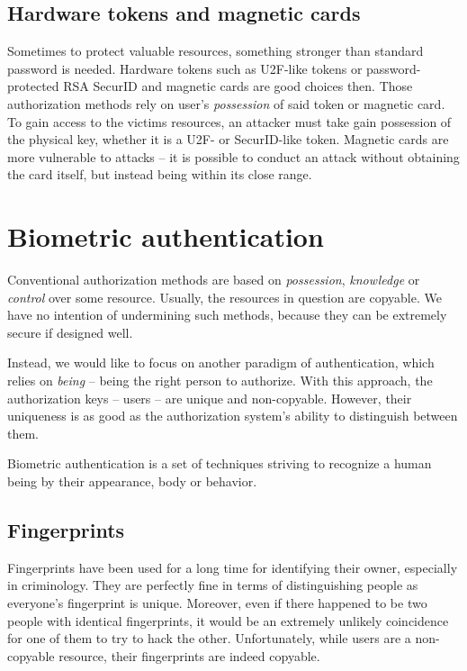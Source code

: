         \subsection*{Hardware tokens and magnetic cards}
            Sometimes to protect valuable resources,
            something stronger than standard password is needed.
            Hardware tokens such as U2F-like tokens or password-protected RSA SecurID
            and magnetic cards are good choices then.
            Those authorization methods rely on user's
            \textit{possession} of said token or magnetic card. To
            gain access to the victims resources, an attacker must take gain
            possession of the physical key, whether it is a U2F- or SecurID-like token.
            Magnetic cards are more vulnerable to attacks -- it is possible to
            conduct an attack without obtaining the card itself, but instead
            being within its close range.

    \section{Biometric authentication}
        Conventional authorization methods are based on \textit{possession},
        \textit{knowledge} or \textit{control} over some resource. Usually, the
        resources in question are copyable.
        We have no intention of undermining such methods, because they can be
        extremely secure if designed well.

        Instead, we would like to focus on another paradigm of authentication,
        which relies on \textit{being} -- being the right person to authorize.
        With this approach, the authorization keys -- users -- are unique and non-copyable. However,
        their uniqueness is as good as the authorization system's ability to
        distinguish between them.

        Biometric authentication is a set of techniques striving to recognize a
        human being by their appearance, body or behavior.

        \subsection*{Fingerprints}
            Fingerprints have been used for a long time for identifying their
            owner, especially in criminology. They are perfectly fine in terms of
            distinguishing people as everyone's fingerprint is unique. Moreover,
            even if there happened to be two people with identical fingerprints,
            it would be an extremely unlikely coincidence for one of them to try
            to hack the other.
            Unfortunately, while users are a non-copyable resource, their fingerprints
            are indeed copyable.

